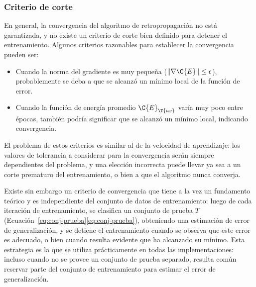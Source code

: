 %
\subsubsection{Criterio de corte}
%
En general, la convergencia del algoritmo de retropropagación no está
garantizada, y no existe un criterio de corte bien definido para
detener el entrenamiento. Algunos criterios razonables para establecer
la convergencia pueden ser:
%
\begin{itemize}
\item Cuando la norma del gradiente es muy pequeña
  ($\|\nabla\C{E}\|\leq\epsilon$), probablemente se deba a que se
  alcanzó un mínimo local de la función de error.
\item Cuando la función de energía promedio $\C{E}_{\T{av}}$ varía muy
  poco entre épocas, también podría significar que se alcanzó un
  mínimo local, indicando convergencia.
\end{itemize}
%
El problema de estos criterios es similar al de la velocidad de
aprendizaje: los valores de tolerancia a considerar para la
convergencia serán siempre dependientes del problema, y una elección
incorrecta puede llevar ya sea a un corte prematuro del entrenamiento,
o bien a que el algoritmo nunca converja.

Existe sin embargo un criterio de convergencia que tiene a la vez un
fundamento teórico y es independiente del conjunto de datos de
entrenamiento: luego de cada iteración de entrenamiento, se clasifica
un conjunto de prueba $T$
(\iflatexml{}Ecuación~\ref{eq:conj-prueba}\else\autoref{eq:conj-prueba}\fi),
obteniendo una estimación de error de generalización, y se detiene el
entrenamiento cuando se observa que este error es adecuado, o bien
cuando resulta evidente que ha alcanzado su mínimo. Esta estrategia es
la que se utiliza prácticamente en todas las implementaciones: incluso
cuando no se provee un conjunto de prueba separado, resulta común
reservar parte del conjunto de entrenamiento para estimar el error de
generalización.

